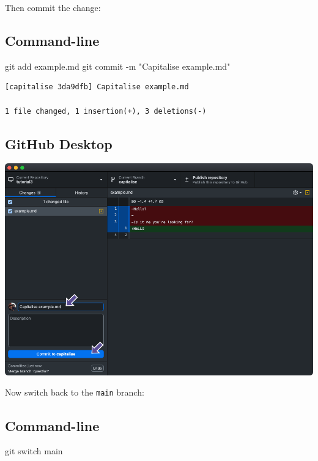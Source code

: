 \documentclass[
  letterpaper,
  DIV=11,
  numbers=noendperiod]{scrartcl}
\newenvironment{Shaded}{\begin{snugshade}}{\end{snugshade}}
\newcommand{\AttributeTok}[1]{\textcolor[rgb]{0.40,0.45,0.13}{#1}}
\newcommand{\FunctionTok}[1]{\textcolor[rgb]{0.28,0.35,0.67}{#1}}
\newcommand{\NormalTok}[1]{\textcolor[rgb]{0.00,0.23,0.31}{#1}}
\newcommand{\StringTok}[1]{\textcolor[rgb]{0.13,0.47,0.30}{#1}}
\begin{document}
Then commit the change:

\subsection{Command-line}

\begin{Shaded}
\begin{Highlighting}[]
\FunctionTok{git}\NormalTok{ add example.md}
\FunctionTok{git}\NormalTok{ commit }\AttributeTok{{-}m} \StringTok{"Capitalise example.md"}
\end{Highlighting}
\end{Shaded}

\begin{verbatim}
[capitalise 3da9dfb] Capitalise example.md

1 file changed, 1 insertion(+), 3 deletions(-)
\end{verbatim}

\subsection{GitHub Desktop}

\includegraphics{images/image47.png}

Now switch back to the \texttt{main} branch:

\subsection{Command-line}

\begin{Shaded}
\begin{Highlighting}[]
\FunctionTok{git}\NormalTok{ switch main}
\end{Highlighting}
\end{Shaded}
\end{document}
